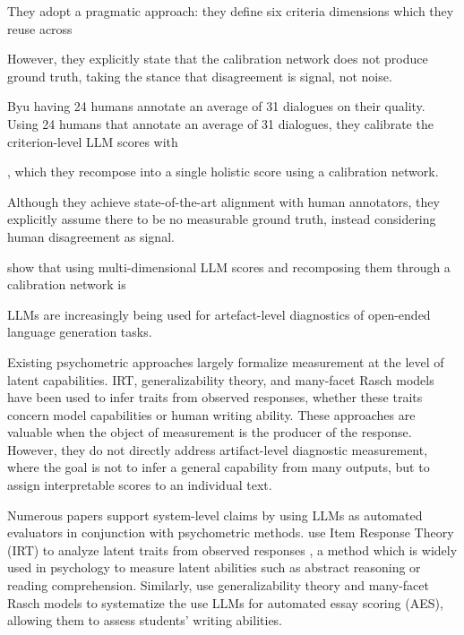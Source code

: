 \newpage



They adopt a pragmatic approach: they define six criteria dimensions which they reuse across 

However, they explicitly state that the calibration network does not produce ground truth, taking the stance that disagreement is signal, not noise. 

Byu having 24 humans annotate an average of 31 dialogues on their quality. Using 24 humans that annotate an average of 31 dialogues, they calibrate the criterion-level LLM scores with 

, which they recompose into a single holistic score using a calibration network. 

Although they achieve state-of-the-art alignment with human annotators, they explicitly assume there to be no measurable ground truth, instead considering human disagreement as signal. 

show that using multi-dimensional LLM scores and recomposing them through a calibration network is 

LLMs are increasingly being used for artefact-level diagnostics of open-ended language generation tasks. 






Existing psychometric approaches largely formalize measurement at the level of latent capabilities. IRT, generalizability theory, and many-facet Rasch models have been used to infer traits from observed responses, whether these traits concern model capabilities or human writing ability. These approaches are valuable when the object of measurement is the producer of the response. However, they do not directly address artifact-level diagnostic measurement, where the goal is not to infer a general capability from many outputs, but to assign interpretable scores to an individual text.


Numerous papers support system-level claims by using LLMs as automated evaluators in conjunction with psychometric methods. \citet{choiDiagnosingReliabilityLLMasaJudge2026, robertsonIdentityLinkIRTLabelFree2025} use Item Response Theory (IRT) to analyze latent traits from observed responses \citep{embretsonItemResponseTheory2013}, a method which is widely used in psychology to measure latent abilities such as abstract reasoning or reading comprehension. Similarly, \citet{wang2025evaluating} use generalizability theory and many-facet Rasch models to systematize the use LLMs for automated essay scoring (AES), allowing them to assess students' writing abilities. 

